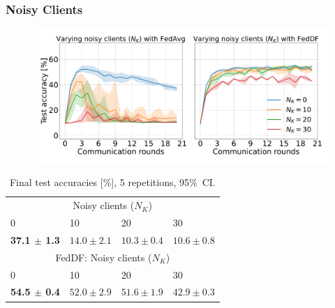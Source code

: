 \documentclass{beamer}
\begin{document}
\begin{frame}
    \frametitle{Noisy Clients}
    \begin{figure}[H]
        \centering
	\includegraphics[width=.7\linewidth]{imgs/noisy_clients.pdf}
    \end{figure}\noindent
\begin{table}[htb!]
    \centering
    \footnotesize
    \begin{tabular}{llll}
       \hline
        \multicolumn{4}{c}{Noisy clients ($N_K$)}\\
        0 & 10 & 20 & 30 \\
       \hline
        \textbf{ 37.1 $\pm$ 1.3 } & $14.0 \pm 2.1$ & $10.3 \pm 0.4$ & $10.6 \pm 0.8$ \\
        \multicolumn{4}{c}{FedDF: Noisy clients ($N_K$)}\\
        0 & 10 & 20 & 30 \\
       \hline
        \textbf{ 54.5 $\pm $ 0.4 } & $52.0 \pm 2.9$ & $51.6 \pm 1.9$ & $42.9 \pm 0.3$ \\
\end{tabular}
    \caption{
    Final test accuracies [\%], 5 repetitions, 95\%\ CI.
    }
\end{table}
\end{frame}
\end{document}
